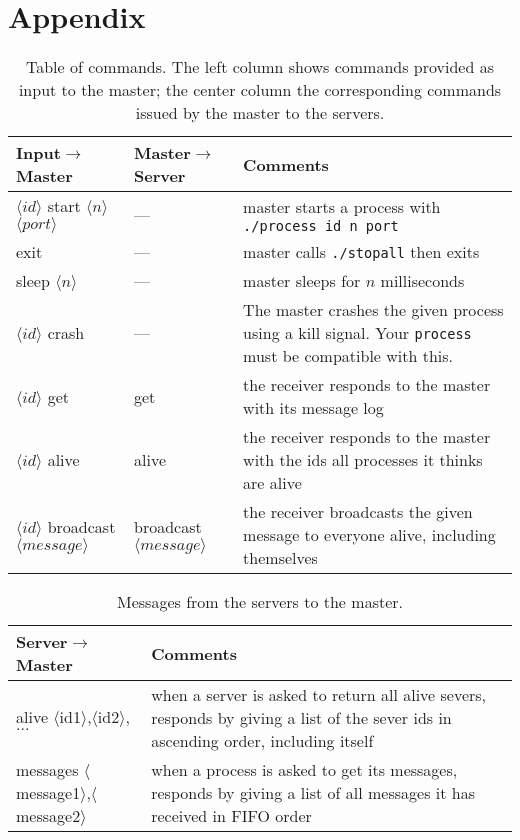 \documentclass[11pt]{article}
\begin{document}
    \section{Appendix}\label{sec:appendix}
    \begin{table}[!h]
        \centering
        \begin{tabular}{|p{5cm}|p{3.5cm}|p{6.5cm}|}
            \hline
            Input$\to$Master & Master$\to$Server & Comments \\
            \hline
            \hline
            $\langle id\rangle$ start $\langle n\rangle$ $\langle port\rangle$& --- &
            master starts a process with \texttt{./process id n port} \\
            \hline
            exit & --- & master calls \texttt{./stopall} then exits\\
            \hline
            sleep $\langle n \rangle$ & --- & master sleeps for $n$ milliseconds\\
            \hline
            $\langle id\rangle$ crash & --- & The master crashes the given process using a kill signal. Your \texttt{process} must be compatible with this.\\
            \hline
            \hline
            $\langle id\rangle$ get & get & the receiver responds to the master with its message log\\
            \hline
            $\langle id\rangle$ alive & alive & the receiver responds to the master with the ids all processes it thinks are alive\\
            \hline
            $\langle id\rangle$ broadcast $\langle message\rangle$ & broadcast $\langle message\rangle$ & the receiver broadcasts the given message to everyone alive, including themselves\\
            \hline
        \end{tabular}
        \caption{Table of commands.
        The left column shows commands provided as input to the master;
        the center column the corresponding commands issued by the master to the servers.}
        \label{tab:commands}
    \end{table}

    \begin{table}[!h]
        \centering
        \begin{tabular}{|p{6cm}|p{10cm}|}
            \hline
            Server$\to$Master & Comments \\
            \hline
            \hline
            alive $\langle$id1$\rangle$,$\langle$id2$\rangle$,$...$ & when a server is asked to return all alive severs, responds by giving a list of the sever ids in ascending order, including itself\\
            \hline
            messages $\langle$message1$\rangle$,$\langle$message2$\rangle$ & when a process is asked to get its messages, responds by giving a list of all messages it has received in FIFO order\\
            \hline
        \end{tabular}
        \caption{Messages from the servers to the master. }
        \label{tab:commands2}
    \end{table}
\end{document}
